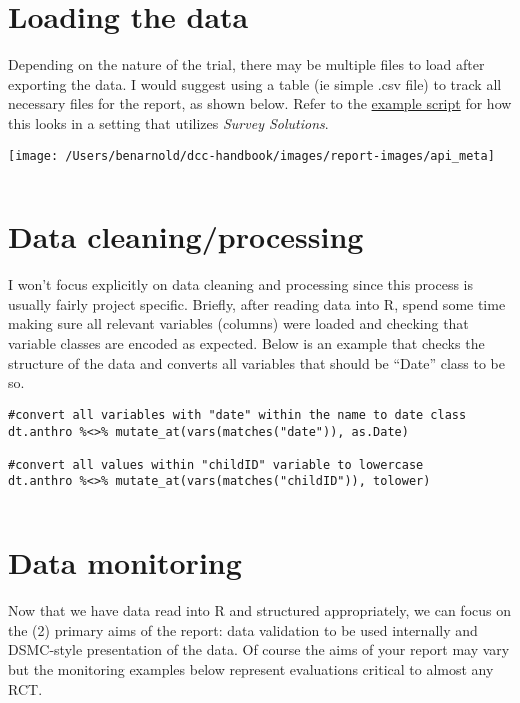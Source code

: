 \documentclass[
]{book}
\begin{document}
\(~\)

\hypertarget{loading-the-data}{%
\section{Loading the data}\label{loading-the-data}}

Depending on the nature of the trial, there may be multiple files to load after exporting the data. I would suggest using a table (ie simple .csv file) to track all necessary files for the report, as shown below. Refer to the \href{templates/read_clean_data_example.R}{example script} for how this looks in a setting that utilizes \emph{Survey Solutions}.

\texttt{[image: /Users/benarnold/dcc-handbook/images/report-images/api\_meta]}

\(~\)

\hypertarget{data-cleaningprocessing}{%
\section{Data cleaning/processing}\label{data-cleaningprocessing}}

I won't focus explicitly on data cleaning and processing since this process is usually fairly project specific. Briefly, after reading data into R, spend some time making sure all relevant variables (columns) were loaded and checking that variable classes are encoded as expected. Below is an example that checks the structure of the data and converts all variables that should be ``Date'' class to be so.

\begin{verbatim}
#convert all variables with "date" within the name to date class
dt.anthro %<>% mutate_at(vars(matches("date")), as.Date)

#convert all values within "childID" variable to lowercase
dt.anthro %<>% mutate_at(vars(matches("childID")), tolower)
\end{verbatim}

\(~\)

\hypertarget{data-monitoring}{%
\section{Data monitoring}\label{data-monitoring}}

Now that we have data read into R and structured appropriately, we can focus on the (2) primary aims of the report: data validation to be used internally and DSMC-style presentation of the data. Of course the aims of your report may vary but the monitoring examples below represent evaluations critical to almost any RCT.
\end{document}

